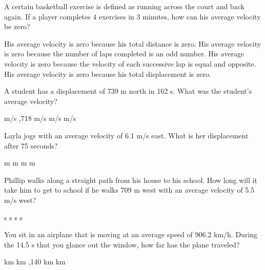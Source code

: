 \documentclass[answers]{exam}
\begin{document}
\begin{questions}
\begin{questions}
\clearpage





\question %
A certain basketball exercise is defined as running across the court and back again. If a player completes 4 exercises in 3 minutes, how can his average velocity be zero?
\begin{choices}
\choice His average velocity is zero because his total distance is zero.
\choice His average velocity is zero because the number of laps completed is an odd number.
\choice His average velocity is zero because the velocity of each successive lap is equal and opposite.
\CorrectChoice His average velocity is zero because his total displacement is zero.
\end{choices}

\question %
A student has a displacement of 739 m north in 162 s. What was the student's average velocity?

\begin{choices}
 m/s
,718 m/s
 m/s
 m/s
\end{choices}

\question %
Layla jogs with an average velocity of 6.1 m/s east. What is her displacement after 75 seconds?

\begin{choices}
 m
 m
 m
 m
\end{choices}

\question %
Phillip walks along a straight path from his house to his school. How long will it take him to get to school if he walks 709 m west with an average velocity of 5.5 m/s west?


\begin{choices}
 s
 s
 s
 s
\end{choices}



\question %
You sit in an airplane that is moving at an average speed of 906.2 km/h. During the 14.5 s that you glance out the window, how far has the plane traveled?

\begin{choices}
 km
 km
,140 km
 km
\end{choices}






\end{questions}
\end{questions}
\end{document}
